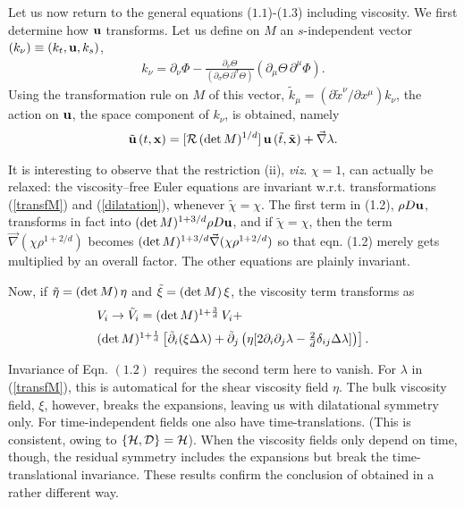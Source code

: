 \documentclass[11pt,a4paper]{article}
\def\D{{\cal D}}
\def\H{{\cal H}}
\begin{document}
\goodbreak
Let us now return to the general equations ($1.1$)-($1.3$)
 including viscosity.  We first determine  how ${\bf u}$
transforms. Let us define on $M$ an $s$-independent  vector
$(k_\nu)\equiv (k_t,{\bf u},k_s)$,
\begin{eqnarray}
k_\nu=
\partial_\nu\Phi-\displaystyle{\frac{\partial_\nu\Theta}
{\left(\partial_
\sigma\Theta
\,\partial^\sigma\Theta\right)}\left(\partial_\mu\Theta
\,\partial^\mu\Phi\right)}.
\label{budapest}
\end{eqnarray}
Using the transformation rule on $M$ of this vector,
$\displaystyle{\tilde{k}_\mu=
\left(\partial \tilde{x}^\nu/\partial {x}^\mu
\right)k_\nu}$, the action on ${\bf u}$, the
space component of $k_{\nu}$, is obtained, namely
\begin{eqnarray}
\tilde{{\bf u}}\,(t,{\bf x})=[{\cal
R}\,(\hbox{det}\,M)^{1/d}]\,{\bf u}\,(\tilde{t},{\tilde{{\bf x}}})
+\vec{\nabla}\lambda.
\end{eqnarray}

It is interesting to observe that the restriction (ii), {\it viz}.
$\chi=1$, can actually be relaxed:
 the viscosity--free Euler equations
 are invariant w.r.t. transformations (\ref{transfM})
and (\ref{dilatation}), whenever  $\tilde{\chi}=\chi$.
The first term in  (1.2), $\rho D{\bf u}$,  transforms in fact into
$({\rm det}\,M)^{1+3/d}\rho D{\bf u}$, and if
$\tilde{\chi}=\chi$, then the term $\vec{\nabla}(\chi\rho^{1+2/d})$ becomes
$({\rm det}\,M)^{1+3/d}\vec{\nabla}(\chi\rho^{1+2/d})$ so that eqn. (1.2)
merely gets multiplied by an overall factor. The other equations are
plainly invariant.


Now, if
$\tilde{\eta}=(\hbox{det}\,M)\,\eta$ and
$\tilde{\xi}=(\hbox{det}\,M)\,\xi$, the viscosity term
transforms as
\begin{equation}
   \begin{array}{c}
V_i\to \tilde{V}_i=(\hbox{det}\,M)^{1+\frac{3}{d}}\,V_i+\hfill
\\[2mm]
(\hbox{det}\,M)^{1+\frac{1}{d}}
\left[\tilde{\partial}_i(\xi\Delta
\lambda)+\tilde{\partial}_j\left(\eta[2
\partial_i\partial_j\lambda-\frac{2}{d}\delta_{ij}\Delta
\lambda]\right)\right].
\label{obstruct}
\end{array}
\end{equation}

Invariance of Eqn. $(1.2)$ requires the second term here to vanish.
For  $\lambda$ in (\ref{transfM}), this is automatical for the shear
viscosity field $\eta$. The bulk viscosity field, $\xi$, however,
breaks the expansions, leaving us with dilatational
symmetry only. For time-independent fields
one also have time-translations. (This is consistent, owing to $\{\H,
\D\}=\H$). When the viscosity fields only depend on time, though,
the residual symmetry includes the expansions but break the
time-translational invariance. These results confirm the conclusion
of \cite{RS} obtained in a rather different way.
\end{document}
